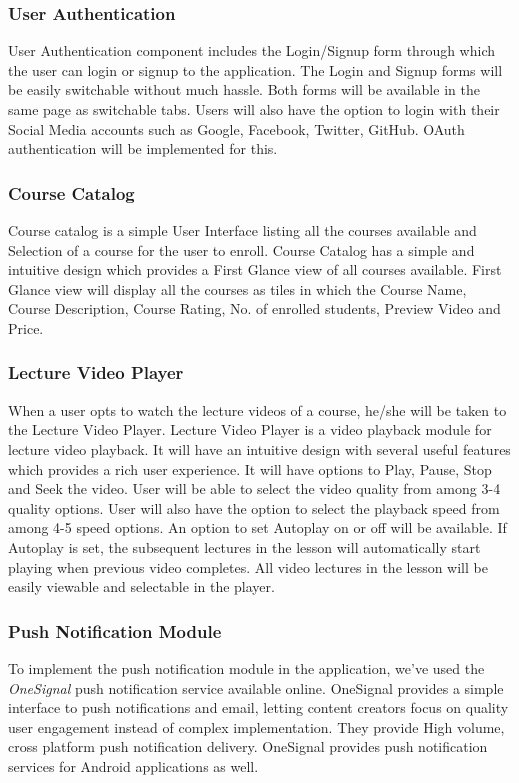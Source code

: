 \subsubsection{User Authentication}

User Authentication component includes the Login/Signup form through which the user can login or signup to the application. The Login and Signup forms will be easily switchable without much hassle. Both forms will be available in the same page as switchable tabs. Users will also have the option to login with their Social Media accounts such as Google, Facebook, Twitter, GitHub. OAuth authentication will be implemented for this.

\subsubsection{Course Catalog}

Course catalog is a simple User Interface listing all the courses available and Selection of a course for the user to enroll. Course Catalog has a simple and intuitive design which provides a First Glance view of all courses available. First Glance view will display all the courses as tiles in which the Course Name, Course Description, Course Rating, No. of enrolled students, Preview Video and Price.

\subsubsection{Lecture Video Player}

When a user opts to watch the lecture videos of a course, he/she will be taken to the Lecture Video Player. Lecture Video Player is a video playback module for lecture video playback. It will have an intuitive design with several useful features which provides a rich user experience. It will have options to Play, Pause, Stop and Seek the video. User will be able to select the video quality from among 3-4 quality options. User will also have the option to select the playback speed from among 4-5 speed options. An option to set Autoplay on or off will be available. If Autoplay is set, the subsequent lectures in the lesson will automatically start playing when previous video completes. All video lectures in the lesson will be easily viewable and selectable in the player.

\subsubsection{Push Notification Module}
To implement the push notification module in the application, we've used the {\em OneSignal} push notification service available online. OneSignal provides a simple interface to push notifications and email, letting content creators focus on quality user engagement instead of complex implementation. They provide High volume, cross platform push notification delivery. OneSignal provides push notification services for Android applications as well.

